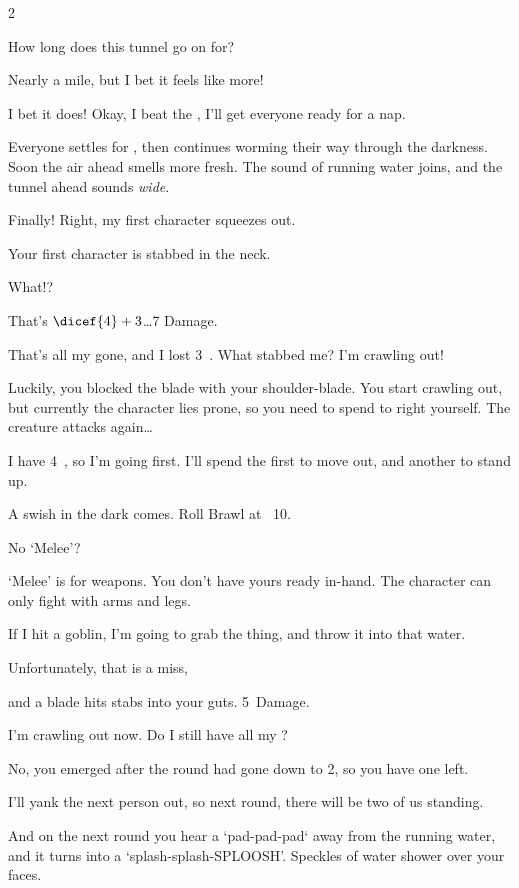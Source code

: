 \begin{multicols}{2}
\begin{description}
  How long does this tunnel go on for?
  \item[\Glsentrytext{gm}:]
  Nearly a mile, but I bet it feels like more!
  \item[Player 1:]
  I bet it does!
  Okay, I beat the , I'll get everyone ready for a nap.
  \item[\Glsentrytext{gm}:]
  Everyone settles for , then continues worming their way through the darkness.
  Soon the air ahead smells more fresh.
  The sound of running water joins, and the tunnel ahead sounds \emph{wide}.
  \item[Player 3:]
  Finally!
  Right, my first character squeezes out.
  \item[\Glsentrytext{gm}:]
  Your first character is stabbed in the neck.
  \item[Player 3:]
  What!?
  \item[\Glsentrytext{gm}:]
  That's $\dicef{4}+3$\ldots 7 Damage.
  \item[Player 3:]
  That's all my  gone, and I lost 3~.
  What stabbed me?
  I'm crawling out!
  \item[\Glsentrytext{gm}:]
  Luckily, you blocked the blade with your shoulder-blade.
  You start crawling out, but currently the character lies prone, so you need to spend  to right yourself.
  The creature attacks again\ldots
  \item[Player 3:]
  I have 4~, so I'm going first.
  I'll spend the first  to move out, and another to stand up.
  \item[\Glsentrytext{gm}:]
  A swish in the dark comes.
  Roll Brawl at ~10.
  \item[Player 3:]
  No `Melee'?
  \item[\Glsentrytext{gm}:]
  `Melee' is  for weapons.
  You don't have yours ready in-hand.
  The character can only fight with arms and legs.
  \item[Player 3:]
  If I hit a goblin, I'm going to grab the thing, and throw it into that water.
  \item[Player 3:]
  Unfortunately, that is a miss,
  \item[\Glsentrytext{gm}:]
  and a blade hits stabs into your guts.
  5~Damage.
  \item[Player 1:]
  I'm crawling out now.
  Do I still have all my ?
  \item[\Glsentrytext{gm}:]
  No, you emerged after the \gls{round} had gone down to 2, so you have one  left.
  \item[Player 1:]
  I'll yank the next person out, so next \gls{round}, there will be two of us standing.
  \item[\Glsentrytext{gm}:]
  And on the next \gls{round} you hear a `pad-pad-pad` away from the running water, and it turns into a `splash-splash-SPLOOSH'.
  Speckles of water shower over your faces.
\end{description}


\end{multicols}
